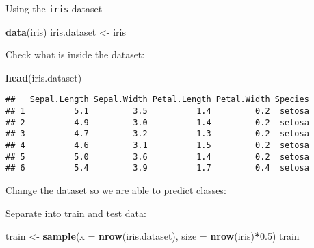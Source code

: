 \documentclass[]{article}
\newenvironment{Shaded}{\begin{snugshade}}{\end{snugshade}}
\newcommand{\DataTypeTok}[1]{\textcolor[rgb]{0.13,0.29,0.53}{#1}}
\newcommand{\FloatTok}[1]{\textcolor[rgb]{0.00,0.00,0.81}{#1}}
\newcommand{\KeywordTok}[1]{\textcolor[rgb]{0.13,0.29,0.53}{\textbf{#1}}}
\newcommand{\NormalTok}[1]{#1}
\newcommand{\OperatorTok}[1]{\textcolor[rgb]{0.81,0.36,0.00}{\textbf{#1}}}
\newcommand{\StringTok}[1]{\textcolor[rgb]{0.31,0.60,0.02}{#1}}
\begin{document}
Using the \texttt{iris} dataset

\begin{Shaded}
\begin{Highlighting}[]
\KeywordTok{data}\NormalTok{(iris)}
\NormalTok{iris.dataset <-}\StringTok{ }\NormalTok{iris}
\end{Highlighting}
\end{Shaded}

Check what is inside the dataset:

\begin{Shaded}
\begin{Highlighting}[]
\KeywordTok{head}\NormalTok{(iris.dataset)}
\end{Highlighting}
\end{Shaded}

\begin{verbatim}
##   Sepal.Length Sepal.Width Petal.Length Petal.Width Species
## 1          5.1         3.5          1.4         0.2  setosa
## 2          4.9         3.0          1.4         0.2  setosa
## 3          4.7         3.2          1.3         0.2  setosa
## 4          4.6         3.1          1.5         0.2  setosa
## 5          5.0         3.6          1.4         0.2  setosa
## 6          5.4         3.9          1.7         0.4  setosa
\end{verbatim}

Change the dataset so we are able to predict classes:

\begin{Shaded}
\end{Shaded}

Separate into train and test data:

\begin{Shaded}
\begin{Highlighting}[]
\NormalTok{train <-}\StringTok{ }\KeywordTok{sample}\NormalTok{(}\DataTypeTok{x =} \KeywordTok{nrow}\NormalTok{(iris.dataset), }\DataTypeTok{size =} \KeywordTok{nrow}\NormalTok{(iris)}\OperatorTok{*}\FloatTok{0.5}\NormalTok{)}
\NormalTok{train}
\end{Highlighting}
\end{Shaded}
\end{document}
